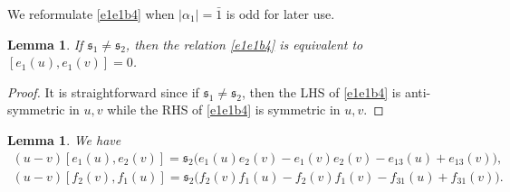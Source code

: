 \documentclass[11pt,reqno]{amsart}
\numberwithin{equation}{section}
\newtheorem{lem}[thm]{Lemma}
\theoremstyle{definition}
\theoremstyle{remark}
\newcommand{\ka}{{\mathfrak s}}
\begin{document}
We reformulate \eqref{e1e1b4} when $|\alpha_1|=\bar 1$ is odd for later use.
\begin{lem}\label{odd0}
If $\ka_1\ne \ka_{2}$, then the relation \eqref{e1e1b4} is equivalent to $[e_1(u),e_1(v)]=0$.
\end{lem}
\begin{proof}
It is straightforward since if $\ka_1\ne \ka_{2}$, then the LHS of \eqref{e1e1b4} is anti-symmetric in $u,v$ while the RHS of \eqref{e1e1b4} is symmetric in $u,v$.
\end{proof}

\begin{lem}\label{be1e2lem}
We have
\begin{align}
(u-v)[e_1(u),e_2(v)]=\ka_2\big(e_1(u)e_2(v)-e_1(v)e_2(v)-e_{13}(u)+e_{13}(v)\big),\label{be1e2}\\
(u-v)[f_2(v),f_1(u)]=\ka_2\big(f_2(v)f_1(u)-f_2(v)f_1(v)-f_{31}(u)+f_{31}(v)\big).\label{bf1f2}
\end{align}
\end{lem}
\end{document}

